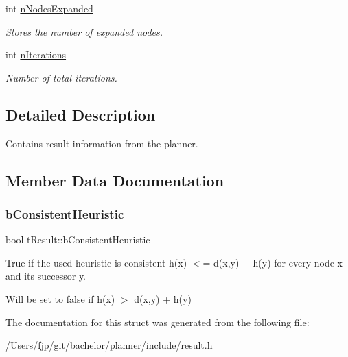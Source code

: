 \begin{DoxyCompactItemize}
\mbox{\label{structt_result_aeec87653572128a631adb83face701ee}} 
int \mbox{\hyperlink{structt_result_aeec87653572128a631adb83face701ee}{n\+Nodes\+Expanded}}
\begin{DoxyCompactList}\small\item\em Stores the number of expanded nodes. \end{DoxyCompactList}\item 
\mbox{\label{structt_result_ae43cdacfd85c009a19f17af62adf8729}} 
int \mbox{\hyperlink{structt_result_ae43cdacfd85c009a19f17af62adf8729}{n\+Iterations}}
\begin{DoxyCompactList}\small\item\em Number of total iterations. \end{DoxyCompactList}\end{DoxyCompactItemize}


\subsection{Detailed Description}
Contains result information from the planner. 

\subsection{Member Data Documentation}
\mbox{\label{structt_result_a7d87aab6411a466aed07a27a70eeded2}} 
\subsubsection{\texorpdfstring{b\+Consistent\+Heuristic}{bConsistentHeuristic}}
{\footnotesize\ttfamily bool t\+Result\+::b\+Consistent\+Heuristic}



True if the used heuristic is consistent h(x) $<$= d(x,y) + h(y) for every node x and its successor y. 

Will be set to false if h(x) $>$ d(x,y) + h(y) 

The documentation for this struct was generated from the following file\+:\begin{DoxyCompactItemize}
\item 
/\+Users/fjp/git/bachelor/planner/include/result.\+h\end{DoxyCompactItemize}
